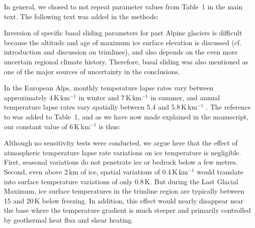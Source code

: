     In general, we chosed to not repeat parameter values from Table~1 in the
    main text. The following text was added in the methods:


    Inversion of specific basal sliding parameters for past Alpine glaciers
    is difficult because the altitude and age of maximum ice surface elevation
    is discussed (cf. introduction and discussion on trimlines), and also
    depends on the even more uncertain regional climate history.  Therefore,
    basal sliding was also mentioned as one of the major sources of
    uncertainty in the conclusions.

    

    In the European Alps, monthly temperature lapse rates vary between
    approximately 4\,K\,km$^{-1}$ in winter and 7\,K\,km$^{-1}$ in summer, and
    annual temperature lapse rates vary spatially between 5.4 and
    5.8\,K\,km$^{-1}$ \citep{Rolland.2003}. The reference to
    \citet{Rolland.2003} was added to Table~1, and as we have now made
    explained in the manuscript, our constant value of 6\,K\,km$^{-1}$ is thus:


    Although no sensitivity tests were conducted, we argue here that the effect
    of atmospheric temperature lapse rate variations on ice temperature is
    negligible. First, seasonal variations do not penetrate ice or bedrock
    below a few metres. Second, even above 2\,km of ice, spatial variations of
    0.4\,K\,km$^{-1}$ would translate into surface temperature variations of
    only 0.8\,K. But during the Last Glacial Maximum, ice surface temperatures
    in the trimline region are typically between 15 and 20\,K below freezing.
    In addition, this effect would nearly disappear near the base where the
    temperature gradient is much steeper and primarily controlled by geothermal
    heat flux and shear heating.


